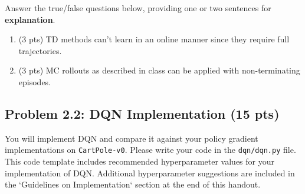\documentclass[12pt]{article}
\begin{document}
Answer the true/false questions below, providing one or two sentences for \textbf{explanation}.
\begin{enumerate} %
    \item (3 pts) TD methods can't learn in an online manner since they require full trajectories.
    \item (3 pts) MC rollouts as described in class can be applied with non-terminating episodes.
    
\end{enumerate}

\subsection*{Problem 2.2: DQN Implementation (15 pts)}
You will implement DQN and compare it against your policy gradient implementations on \texttt{CartPole-v0}. Please write your code in the \texttt{dqn/dqn.py} file. This code template includes recommended hyperparameter values for your implementation of DQN. Additional hyperparameter suggestions are included in the `Guidelines on Implementation` section at the end of this handout.
\end{document}
